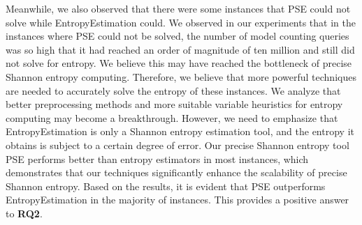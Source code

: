Meanwhile, we also observed that there were some instances that PSE could not solve while EntropyEstimation could.
We observed in our experiments that in the instances where PSE could not be solved, the number of model counting queries was so high that it had reached an order of magnitude of ten million and still did not solve for entropy.
We believe this may have reached the bottleneck of precise Shannon entropy computing.
Therefore, we believe that more powerful techniques are needed to accurately solve the entropy of these instances.
We analyze that better preprocessing methods and more suitable variable heuristics for entropy computing may become a breakthrough.
However, we need to emphasize that EntropyEstimation is only a Shannon entropy estimation tool, and the entropy it obtains is subject to a certain degree of error. 
Our precise Shannon entropy tool PSE performs better than entropy estimators in most instances, which demonstrates that our techniques significantly enhance the scalability of precise Shannon entropy.
Based on the results, it is evident that PSE outperforms EntropyEstimation in the majority of instances. This provides a positive answer to \textbf{RQ2}.



